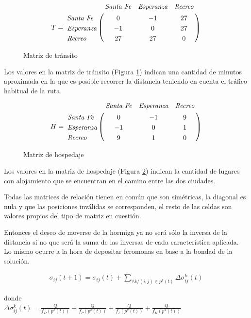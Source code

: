 \documentclass[conference,a4paper,10pt,oneside,final]{tfmpd}
\begin{document}
\begin{figure}[!h]
\begin{align*}
T = \bordermatrix{
~                 & \textit{Santa Fe} & \textit{Esperanza} & \textit{Recreo} \cr
\textit{Santa Fe} & 0                 & -1                  & 27 			  \cr
\textit{Esperanza}& -1                & 0                   & 27              \cr
\textit{Recreo}   & 27                & 27                  & 0}
\end{align*}
\caption{Matriz de tránsito}
\label{fig:MT}
\end{figure}

Los valores en la matriz de tránsito (Figura \ref{fig:MT}) indican una cantidad de minutos aproximada en la que es posible recorrer la distancia teniendo en cuenta el tráfico habitual de la ruta.

\begin{figure}[!h]
\begin{align*}
H = \bordermatrix{
~                 & \textit{Santa Fe} & \textit{Esperanza} & \textit{Recreo} \cr
\textit{Santa Fe} & 0                 & -1                  & 9 			  \cr
\textit{Esperanza}& -1                & 0                   & 1               \cr
\textit{Recreo}   & 9                 & 1                   & 0}
\end{align*}
\caption{Matriz de hospedaje}
\label{fig:MH}
\end{figure}

Los valores en la matriz de hospedaje (Figura \ref{fig:MH}) indican la cantidad de lugares con alojamiento que se encuentran en el camino entre las dos ciudades.

Todas las matrices de relación tienen en común que son simétricas, la diagonal es nula y que las posiciones inválidas se corresponden, el resto de las celdas son valores propios del tipo de matriz en cuestión.

Entonces el deseo de moverse de la hormiga ya no será sólo la inversa de la distancia si no que será la suma de las inversas de cada característica aplicada. Lo mismo ocurre a la hora de depositar feromonas en base a la bondad de la solución.

\begin{align*}
\sigma_{ij}(t+1)=
\sigma_{ij}(t)+\sum_{\forall k/(i,j)\in p^{k}(t)}\Delta\sigma_{ij}^{k}(t)
\end{align*}

donde \\

$
\Delta\sigma_{ij}^{k}(t)
=\frac{Q}{f_{D}(p^{k}(t))}
+\frac{Q}{f_{P}(p^{k}(t))}
+\frac{Q}{f_{T}(p^{k}(t))}
+\frac{Q}{f_{H}(p^{k}(t))}
$ \\
\end{document}
